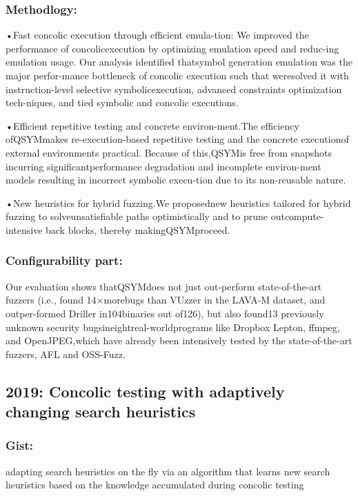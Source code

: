 \documentclass[	runningheads,
				a4paper]{llncs}
\begin{document}
\subsubsection{Methodlogy:}
•Fast concolic execution through efficient emula-tion:
We  improved  the  performance  of  concolicexecution by optimizing emulation speed and reduc-ing emulation usage.  Our analysis identified thatsymbol generation emulation was the major perfor-mance bottleneck of concolic execution such that weresolved it with instruction-level selective symbolicexecution, advanced constraints optimization tech-niques, and tied symbolic and concolic executions.

•Efficient repetitive testing and concrete environ-ment.The efficiency ofQSYMmakes re-execution-based repetitive testing and the concrete executionof external environments practical. Because of this,QSYMis free from snapshots incurring significantperformance degradation and incomplete environ-ment models resulting in incorrect symbolic execu-tion due to its non-reusable nature.

•New heuristics for hybrid fuzzing.We proposednew heuristics tailored for hybrid fuzzing to solveunsatisfiable paths optimistically and to prune outcompute-intensive  back  blocks,  thereby  makingQSYMproceed.

\subsubsection{Configurability part:}
Our evaluation shows thatQSYMdoes not just out-perform state-of-the-art fuzzers (i.e.,  found 14×morebugs than VUzzer in the LAVA-M dataset, and outper-formed Driller in104binaries out of126), but also found13 previously unknown security bugsineightreal-worldprograms like Dropbox Lepton, ffmpeg, and OpenJPEG,which have already been intensively tested by the state-of-the-art fuzzers, AFL and OSS-Fuzz.


\subsection{2019: Concolic testing with adaptively changing search heuristics}
\subsubsection{Gist:}
adapting search heuristics on the fly via an algorithm that learns new search heuristics based on the knowledge accumulated during concolic testing
\end{document}
